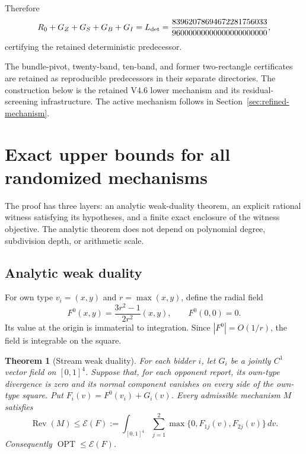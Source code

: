 \documentclass[11pt]{article}
\newtheorem{theorem}{Theorem}
\newcommand{\OPT}{\operatorname{OPT}}
\newcommand{\LowerBound}{\frac{83962078694672281756033}{96000000000000000000000}}
\begin{document}
Therefore
\[
R_0+G_Z+G_S+G_B+G_I
=
L_{\rm det}=\LowerBound,
\]
certifying the retained deterministic predecessor.

The bundle-pivot, twenty-band, ten-band, and former two-rectangle certificates
are retained as reproducible predecessors in their separate directories.
The construction below is the retained V4.6 lower mechanism and its
residual-screening infrastructure. The active mechanism follows in
Section~\ref{sec:refined-mechanism}.





\section{Exact upper bounds for all randomized mechanisms}\label{sec:upper}

The proof has three layers: an analytic weak-duality theorem, an explicit
rational witness satisfying its hypotheses, and a finite exact enclosure of
the witness objective.  The analytic theorem does not depend on polynomial
degree, subdivision depth, or arithmetic scale.

\subsection{Analytic weak duality}\label{subsec:analytic}

For own type \(v_i=(x,y)\) and \(r=\max(x,y)\), define the radial field
\[
F^0(x,y)=\frac{3r^2-1}{2r^2}(x,y),\qquad F^0(0,0)=0.
\]
Its value at the origin is immaterial to integration.  Since
\(|F^0|=O(1/r)\), the field is integrable on the square.

\begin{theorem}[Stream weak duality]\label{thm:stream}
For each bidder \(i\), let \(G_i\) be a jointly \(C^1\) vector field on
\([0,1]^4\).  Suppose that, for each opponent report, its own-type divergence
is zero and its normal component vanishes on every side of the own-type
square.  Put \(F_i(v)=F^0(v_i)+G_i(v)\).  Every admissible mechanism \(M\)
satisfies
\begin{equation}\label{eq:stream-envelope}
\operatorname{Rev}(M)\leq
\mathcal E(F):=\int_{[0,1]^4}\sum_{j=1}^2
\max\{0,F_{1j}(v),F_{2j}(v)\}\,dv.
\end{equation}
Consequently \(\OPT\leq\mathcal E(F)\).
\end{theorem}
\end{document}
